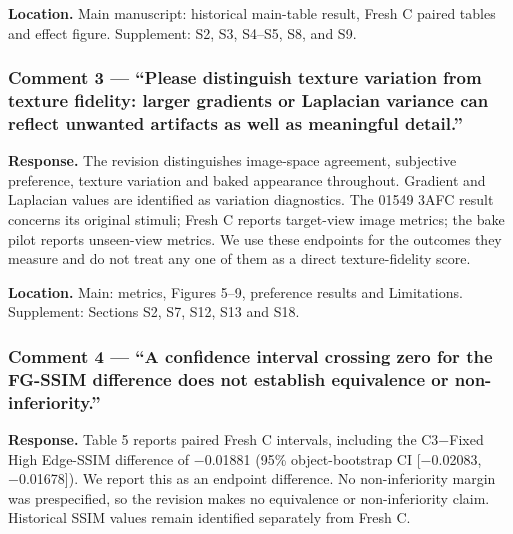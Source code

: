 \documentclass[
  10pt,
]{article}
\begin{document}
\textbf{Location.} Main manuscript: historical main-table result, Fresh C paired tables and effect figure. Supplement: S2, S3, S4--S5, S8, and S9.

\hypertarget{comment-3--please-distinguish-texture-variation-from-texture-fidelity-larger-gradients-or-laplacian-variance-can-reflect-unwanted-artifacts-as-well-as-meaningful-detail}{%
\subsubsection{Comment 3 --- ``Please distinguish texture variation from texture fidelity: larger gradients or Laplacian variance can reflect unwanted artifacts as well as meaningful detail.''}\label{comment-3--please-distinguish-texture-variation-from-texture-fidelity-larger-gradients-or-laplacian-variance-can-reflect-unwanted-artifacts-as-well-as-meaningful-detail}}

\textbf{Response.} The revision distinguishes image-space agreement, subjective preference, texture variation and baked appearance throughout. Gradient and Laplacian values are identified as variation diagnostics. The 01549 3AFC result concerns its original stimuli; Fresh C reports target-view image metrics; the bake pilot reports unseen-view metrics. We use these endpoints for the outcomes they measure and do not treat any one of them as a direct texture-fidelity score.

\textbf{Location.} Main: metrics, Figures 5--9, preference results and Limitations. Supplement: Sections S2, S7, S12, S13 and S18.

\hypertarget{comment-4--a-confidence-interval-crossing-zero-for-the-fg-ssim-difference-does-not-establish-equivalence-or-non-inferiority}{%
\subsubsection{Comment 4 --- ``A confidence interval crossing zero for the FG-SSIM difference does not establish equivalence or non-inferiority.''}\label{comment-4--a-confidence-interval-crossing-zero-for-the-fg-ssim-difference-does-not-establish-equivalence-or-non-inferiority}}

\textbf{Response.} Table 5 reports paired Fresh C intervals, including the C3−Fixed High Edge-SSIM difference of −0.01881 (95\% object-bootstrap CI {[}−0.02083, −0.01678{]}). We report this as an endpoint difference. No non-inferiority margin was prespecified, so the revision makes no equivalence or non-inferiority claim. Historical SSIM values remain identified separately from Fresh C.
\end{document}
